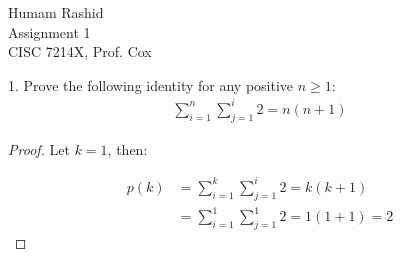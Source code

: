 \documentclass{scrartcl}
\begin{document}
\begin{flushleft}

    Humam Rashid\\
    Assignment 1\\
    CISC 7214X, Prof. Cox\\
    \bigskip
    
    1. Prove the following identity for any positive $n \geq 1$:
    \begin{align*}
        \sum_{i=1}^{n}\sum_{j=1}^{i} 2 = n (n + 1)
    \end{align*}

    \begin{proof}
        Let $k = 1$, then:
        
        \begin{align*}
            p(k) &= \sum_{i=1}^{k}\sum_{j=1}^{i} 2 = k (k + 1) \\
            &= \sum_{i=1}^{1}\sum_{j=1}^{1} 2 = 1 (1 + 1) = 2
        \end{align*}
    \end{proof}

\end{flushleft}
\end{document}
